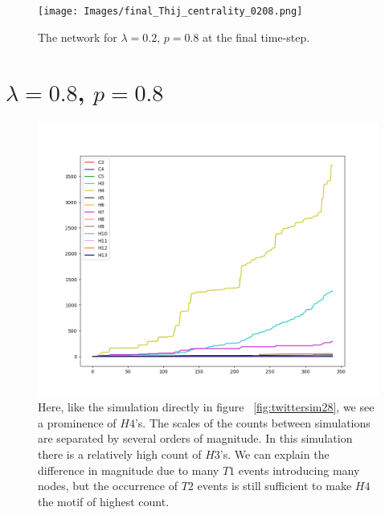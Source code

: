 \begin{figure}[h!]
    \texttt{[image: Images/final\_Thij\_centrality\_0208.png]}
    \centering
    \caption{The network for $\lambda=0.2$, $p=0.8$ at the final time-step.}
    \label{fig:network0208}
\end{figure}

\clearpage

\section{$\lambda=0.8$, $p=0.8$}

\begin{figure}[h!]
    \includegraphics[width=16cm]{Images/twitter_sim_for_stats_3_0.8_0.8.png}
    \centering
    \caption{Here, like the simulation directly in figure ~\ref{fig:twittersim28}, we see a prominence of $H4$'s. The scales of the 
    counts between simulations are separated by several orders of magnitude. In this simulation
     there is a relatively high count of $H3$'s. We can explain the difference in magnitude
     due to many $T1$ events introducing many nodes, but the occurrence of $T2$ events 
     is still sufficient to make $H4$ the motif of highest count.}
     \label{fig:thij0808}
\end{figure}

